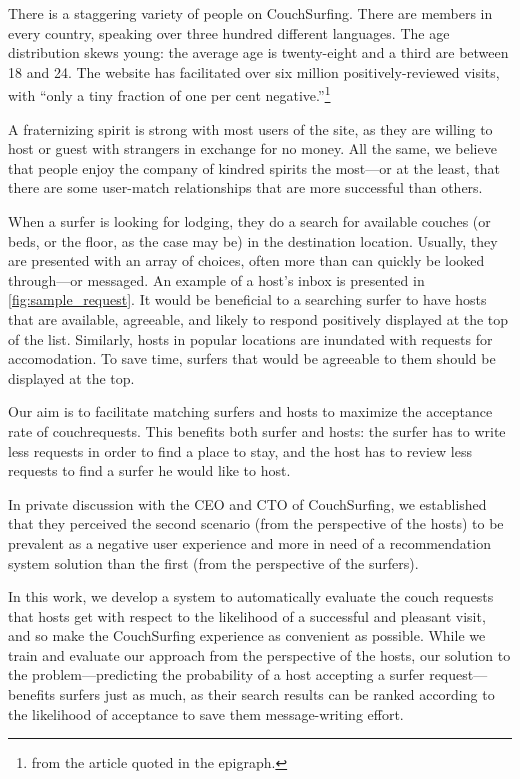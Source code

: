 There is a staggering variety of people on CouchSurfing.
There are members in every country, speaking over three hundred different languages.
The age distribution skews young: the average age is twenty-eight and a third are between 18 and 24.
The website has facilitated over six million positively-reviewed visits, with ``only a tiny fraction of one per cent negative.''\footnote{from the article quoted in the epigraph.}

A fraternizing spirit is strong with most users of the site, as they are willing to host or guest with strangers in exchange for no money.
All the same, we believe that people enjoy the company of kindred spirits the most---or at the least, that there are some user-match relationships that are more successful than others.

When a surfer is looking for lodging, they do a search for available couches (or beds, or the floor, as the case may be) in the destination location.
Usually, they are presented with an array of choices, often more than can quickly be looked through---or messaged.
An example of a host's inbox is presented in \autoref{fig:sample_request}.
It would be beneficial to a searching surfer to have hosts that are available, agreeable, and likely to respond positively displayed at the top of the list.
Similarly, hosts in popular locations are inundated with requests for accomodation.
To save time, surfers that would be agreeable to them should be displayed at the top.

Our aim is to facilitate matching surfers and hosts to maximize the acceptance rate of couchrequests. This benefits both surfer and hosts: the surfer has to write less requests in order to find a place to stay, and the host has to review less requests to find a surfer he would like to host.

In private discussion with the CEO and CTO of CouchSurfing, we established that they perceived the second scenario (from the perspective of the hosts) to be prevalent as a negative user experience and more in need of a recommendation system solution than the first (from the perspective of the surfers).

In this work, we develop a system to automatically evaluate the couch requests that hosts get with respect to the likelihood of a successful and pleasant visit, and so make the CouchSurfing experience as convenient as possible.
While we train and evaluate our approach from the perspective of the hosts, our solution to the problem---predicting the probability of a host accepting a surfer request---benefits surfers just as much, as their search results can be ranked according to the likelihood of acceptance to save them message-writing effort.

